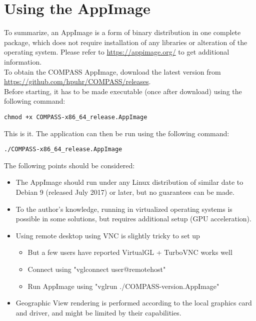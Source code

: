 \section{Using the AppImage}

To summarize, an AppImage is a form of binary distribution in one complete package, which does not require installation of any libraries or alteration of the operating system. 
Please refer to \url{https://appimage.org/} to get additional information. \\

To obtain the COMPASS AppImage, download the latest version from \url{https://github.com/hpuhr/COMPASS/releases}. \\

Before starting, it has to be made executable (once after download) using the following command:
\begin{lstlisting}
chmod +x COMPASS-x86_64_release.AppImage
\end{lstlisting}

This is it. The application can then be run using the following command:
\begin{lstlisting}
./COMPASS-x86_64_release.AppImage
\end{lstlisting}

The following points should be considered:

\begin{itemize}  
\item The AppImage should run under any Linux distribution of similar date to Debian 9 (released July 2017) or later, but no guarantees can be made.
\item To the author's knowledge, running in virtualized operating systems is possible in some solutions, but requires additional setup (GPU acceleration).
\item Using remote desktop using VNC is slightly tricky to set up
\begin{itemize}  
\item But a few users have reported VirtualGL + TurboVNC works well
\item Connect using "vglconnect user@remotehost"
\item Run AppImage using "vglrun ./COMPASS-version.AppImage"
\end{itemize} 
\item Geographic View rendering is performed according to the local graphics card and driver, and might be limited by their capabilities.
\end{itemize}
